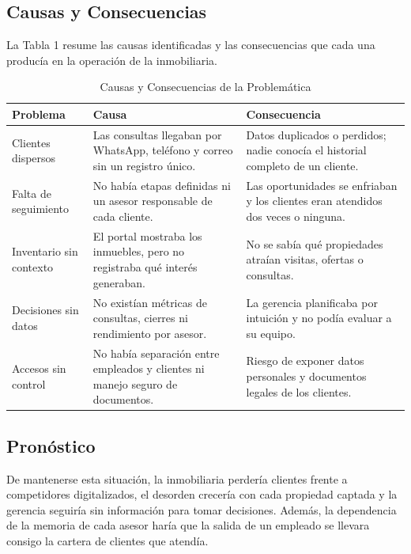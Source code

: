 \documentclass[stu,12pt,letterpaper,donotrepeattitle,floatsintext]{apa7}
\begin{document}
\subsection{Causas y Consecuencias}

La Tabla 1 resume las causas identificadas y las consecuencias que cada una producía en la operación de la inmobiliaria.

\begin{table}[htbp]
\caption{Causas y Consecuencias de la Problemática}
\small
\begin{tabularx}{\linewidth}{>{\hsize}L>{\hsize}L>{\hsize}L}
\toprule
\textbf{Problema} & \textbf{Causa} & \textbf{Consecuencia} \\
\midrule
Clientes dispersos & Las consultas llegaban por WhatsApp, teléfono y correo sin un registro único. & Datos duplicados o perdidos; nadie conocía el historial completo de un cliente. \\
Falta de seguimiento & No había etapas definidas ni un asesor responsable de cada cliente. & Las oportunidades se enfriaban y los clientes eran atendidos dos veces o ninguna. \\
Inventario sin contexto & El portal mostraba los inmuebles, pero no registraba qué interés generaban. & No se sabía qué propiedades atraían visitas, ofertas o consultas. \\
Decisiones sin datos & No existían métricas de consultas, cierres ni rendimiento por asesor. & La gerencia planificaba por intuición y no podía evaluar a su equipo. \\
Accesos sin control & No había separación entre empleados y clientes ni manejo seguro de documentos. & Riesgo de exponer datos personales y documentos legales de los clientes. \\
\bottomrule
\end{tabularx}
\end{table}

\subsection{Pronóstico}

De mantenerse esta situación, la inmobiliaria perdería clientes frente a competidores digitalizados, el desorden crecería con cada propiedad captada y la gerencia seguiría sin información para tomar decisiones. Además, la dependencia de la memoria de cada asesor haría que la salida de un empleado se llevara consigo la cartera de clientes que atendía.
\end{document}
